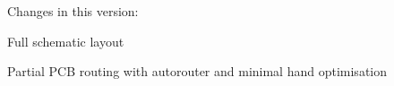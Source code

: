 Changes in this version\+:


\begin{DoxyItemize}
\item Full schematic layout
\item Partial P\+CB routing with autorouter and minimal hand optimisation 
\end{DoxyItemize}